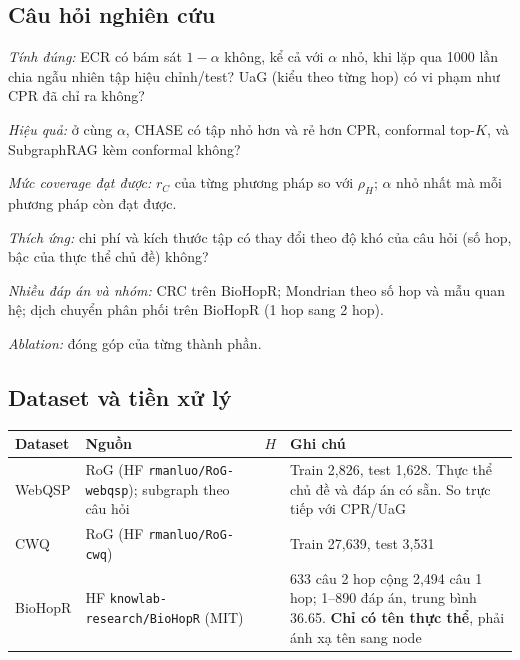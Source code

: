\documentclass[11pt,a4paper]{article}
\theoremstyle{remark}
\newcommand{\method}{\textsc{CHASE}}
\begin{document}
\subsection{Câu hỏi nghiên cứu}
\begin{description}[nosep,leftmargin=1.2cm,style=nextline]
  \item[RQ1] \emph{Tính đúng:} ECR có bám sát $1-\alpha$ không, kể cả với $\alpha$ nhỏ, khi lặp qua 1000 lần chia ngẫu nhiên tập hiệu chỉnh/test? UaG (kiểu theo từng hop) có vi phạm như CPR đã chỉ ra không?
  \item[RQ2] \emph{Hiệu quả:} ở cùng $\alpha$, \method{} có tập nhỏ hơn và rẻ hơn CPR, conformal top-$K$, và SubgraphRAG kèm conformal không?
  \item[RQ3] \emph{Mức coverage đạt được:} $r_C$ của từng phương pháp so với $\rho_H$; $\alpha$ nhỏ nhất mà mỗi phương pháp còn đạt được.
  \item[RQ4] \emph{Thích ứng:} chi phí và kích thước tập có thay đổi theo độ khó của câu hỏi (số hop, bậc của thực thể chủ đề) không?
  \item[RQ5] \emph{Nhiều đáp án và nhóm:} CRC trên BioHopR; Mondrian theo số hop và mẫu quan hệ; dịch chuyển phân phối trên BioHopR (1 hop sang 2 hop).
  \item[RQ6] \emph{Ablation:} đóng góp của từng thành phần.
\end{description}

\subsection{Dataset và tiền xử lý}
\begin{center}
\small
\begin{tabularx}{\linewidth}{>{\raggedright\arraybackslash}p{2.0cm} >{\raggedright\arraybackslash}p{2.5cm} >{\raggedright\arraybackslash}p{0.5cm} >{\raggedright\arraybackslash}X}
\toprule
Dataset & Nguồn & $H$ & Ghi chú \\
\midrule
WebQSP & RoG (HF \texttt{rmanluo/RoG-webqsp}); subgraph theo câu hỏi & 2 & Train 2{,}826, test 1{,}628. Thực thể chủ đề và đáp án có sẵn. So trực tiếp với CPR/UaG \\
CWQ & RoG (HF \texttt{rmanluo/RoG-cwq}) & 4 & Train 27{,}639, test 3{,}531 \\
BioHopR & HF \texttt{knowlab-research/BioHopR} (MIT) & 2 & 7{,}633 câu 2 hop cộng 2{,}494 câu 1 hop; 1--890 đáp án, trung bình 36.65. \textbf{Chỉ có tên thực thể}, phải ánh xạ tên sang node \\\bottomrule
\end{tabularx}
\end{center}
\end{document}
